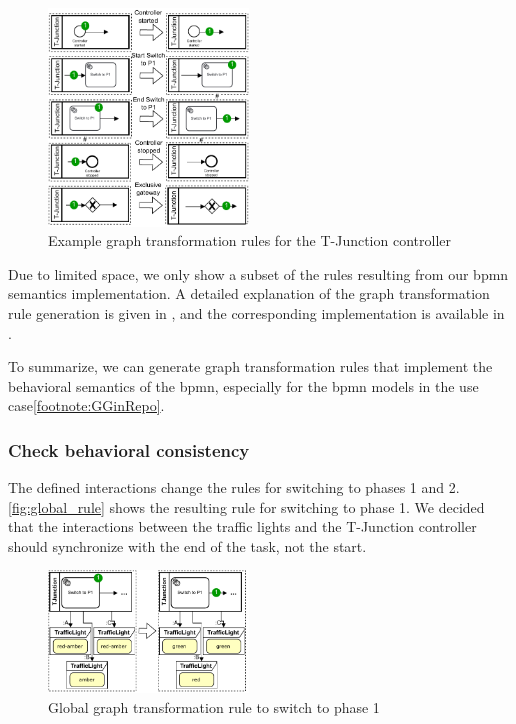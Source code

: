 \documentclass{jot}
\begin{document}
\begin{figure}[h]
    \centering
    \includegraphics[width=0.475\textwidth]{figures/bpmn_rules.pdf}
    \caption{Example graph transformation rules for the T-Junction controller}
    \label{fig:bpmn_example_rules}
\end{figure}

Due to limited space, we only show a subset of the rules resulting from our \gls*{bpmn} semantics implementation.
A detailed explanation of the graph transformation rule generation is given in \cite{krauterFormalizationAnalysisBPMN2022}, and the corresponding implementation is available in \cite{krauterRewriteRuleGeneration2022}.

To summarize, we can generate graph transformation rules that implement the behavioral semantics of the \gls*{bpmn}, especially for the \gls*{bpmn} models in the use case\cref{footnote:GGinRepo}.

\subsubsection{Check behavioral consistency}
The defined interactions change the rules for switching to phases 1 and 2.
\autoref{fig:global_rule} shows the resulting rule for switching to phase 1.
We decided that the interactions between the traffic lights and the T-Junction controller should synchronize with the end of the task, not the start.

\begin{figure}[h]
    \centering
    \includegraphics[width=0.475\textwidth]{figures/global_rule.pdf}
    \caption{Global graph transformation rule to switch to phase 1}
    \label{fig:global_rule}
\end{figure}
\end{document}
